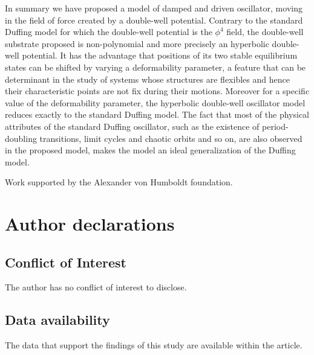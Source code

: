 \documentclass[%
 aip,
cha,
 amsmath,amssymb,
preprint,
]{revtex4-2}
\begin{document}
In summary we have proposed a model of damped and driven oscillator, moving in the field of force created by a double-well potential. Contrary to the standard Duffing model for which the double-well potential is the $\phi^4$ field, the double-well substrate proposed is non-polynomial and more precisely an hyperbolic double-well potential. It has the advantage that positions of its two stable equilibrium states can be shifted by varying a deformability parameter, a feature that can be determinant in the study of systems whose structures are flexibles and hence their characteristic points are not fix during their motions. Moreover for a specific value of the deformability parameter, the hyperbolic double-well oscillator model reduces exactly to the standard Duffing model. The fact that most of the physical attributes of the standard Duffing oscillator, such as the existence of period-doubling transitions, limit cycles and chaotic orbits and so on, are also observed in the proposed model, makes the model an ideal generalization of the Duffing model.
\begin{acknowledgments}
Work supported by the Alexander von Humboldt foundation.
\end{acknowledgments}
\section*{Author declarations}
\subsection*{Conflict of Interest}
The author has no conflict of interest to disclose.
\subsection*{Data availability}
The data that support the findings of this study are available within the article.
\end{document}
